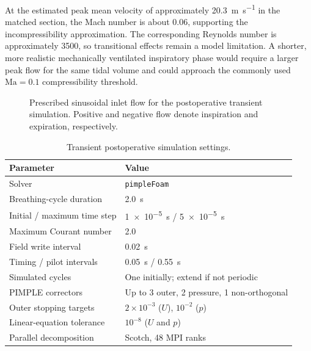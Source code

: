 \documentclass[11pt,a4paper]{article}
\begin{document}
At the estimated peak mean velocity of approximately
\SI{20.3}{\metre\per\second} in the matched section, the Mach number is about
0.06, supporting the incompressibility approximation. The corresponding Reynolds
number is approximately 3500, so transitional effects remain a model limitation.
A shorter, more realistic mechanically ventilated inspiratory phase would require
a larger peak flow for the same tidal volume and could approach the commonly used
$\mathrm{Ma}=0.1$ compressibility threshold.

\begin{figure}[htbp]
  \centering
  \resizebox{0.88\textwidth}{!}{}
  \caption{Prescribed sinusoidal inlet flow for the postoperative transient
  simulation. Positive and negative flow denote inspiration and expiration,
  respectively.}
  \label{fig:transient_waveform}
\end{figure}

\begin{table}[htbp]
  \centering
  \caption{Transient postoperative simulation settings.}
  \label{tab:transient_settings}
  \begin{tabular}{@{}ll@{}}
    \toprule
    Parameter & Value \\
    \midrule
    Solver & \texttt{pimpleFoam} \\
    Breathing-cycle duration & \SI{2.0}{\second} \\
    Initial / maximum time step & \SI{1e-5}{\second} / \SI{5e-5}{\second} \\
    Maximum Courant number & 2.0 \\
    Field write interval & \SI{0.02}{\second} \\
    Timing / pilot intervals & \SI{0.05}{\second} / \SI{0.55}{\second} \\
    Simulated cycles & One initially; extend if not periodic \\
    PIMPLE correctors & Up to 3 outer, 2 pressure, 1 non-orthogonal \\
    Outer stopping targets & $2\times10^{-3}$ ($U$), $10^{-2}$ ($p$) \\
    Linear-equation tolerance & $10^{-8}$ ($U$ and $p$) \\
    Parallel decomposition & Scotch, 48 MPI ranks \\
    \bottomrule
  \end{tabular}
\end{table}

\end{document}
